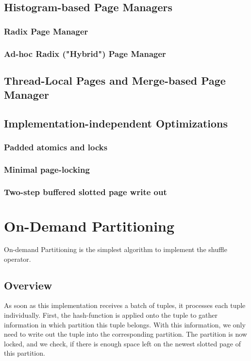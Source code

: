 \subsection{Histogram-based Page Managers}
\subsubsection{Radix Page Manager}
\subsubsection{Ad-hoc Radix ("Hybrid") Page Manager}

\subsection{Thread-Local Pages and Merge-based Page Manager}

\subsection{Implementation-independent Optimizations}
\subsubsection{Padded atomics and locks}
\subsubsection{Minimal page-locking}
\subsubsection{Two-step buffered slotted page write out}

\section{On-Demand Partitioning}
On-demand Partitioning is the simplest algorithm to implement the shuffle operator.
\subsection{Overview}
As soon as this implementation receives a batch of tuples, it processes each tuple individually. First, the hash-function is applied onto the tuple to gather information in which partition this tuple belongs. With this information, we only need to write out the tuple into the corresponding partition. The partition is now locked, and we check, if there is enough space left on the newest slotted page of this partition.

